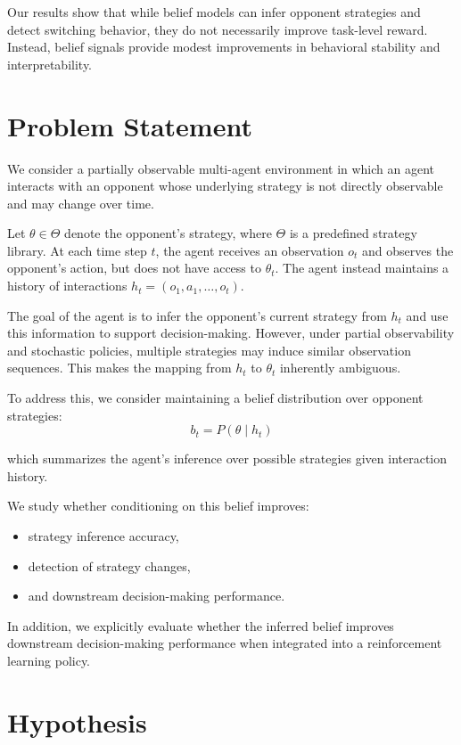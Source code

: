 \documentclass{article}
\begin{document}
Our results show that while belief models can infer opponent strategies and detect switching behavior, they do not necessarily improve task-level reward. Instead, belief signals provide modest improvements in behavioral stability and interpretability.


\section{Problem Statement}
We consider a partially observable multi-agent environment in which an agent interacts with an opponent whose underlying strategy is not directly observable and may change over time.

Let $\theta \in \Theta$ denote the opponent’s strategy, where $\Theta$ is a predefined strategy library. At each time step $t$, the agent receives an observation $o_t$ and observes the opponent’s action, but does not have access to $\theta_t$. The agent instead maintains a history of interactions $h_t = (o_1, a_1, \dots, o_t)$.

The goal of the agent is to infer the opponent’s current strategy from $h_t$ and use this information to support decision-making. However, under partial observability and stochastic policies, multiple strategies may induce similar observation sequences. This makes the mapping from $h_t$ to $\theta_t$ inherently ambiguous.

To address this, we consider maintaining a belief distribution over opponent strategies:
\[
b_t = P(\theta \mid h_t)
\]

which summarizes the agent’s inference over possible strategies given interaction history.

We study whether conditioning on this belief improves:
\begin{itemize}
    \item strategy inference accuracy,
    \item detection of strategy changes,
    \item and downstream decision-making performance.
\end{itemize}

In addition, we explicitly evaluate whether the inferred belief improves downstream decision-making performance when integrated into a reinforcement learning policy.

\section{Hypothesis}
\end{document}
